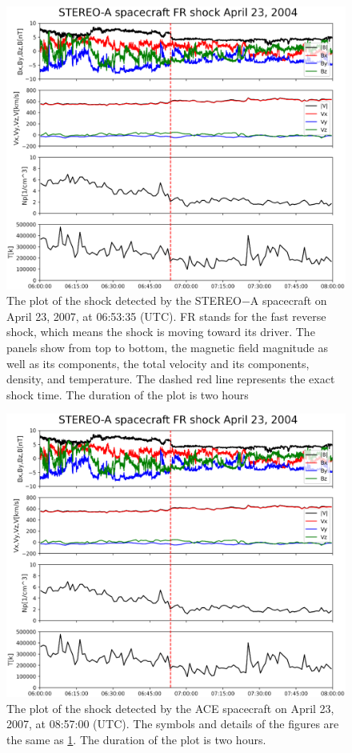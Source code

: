 \documentclass[draft]{agujournal2019}
\begin{document}
 \begin{figure}[!t]
\centering
\includegraphics[width=1.0\textwidth]{jgr-2023-ipshocks-f18.eps}
\caption{The plot of the shock detected by the STEREO$-$A spacecraft on April 23, 2007, at 06:53:35 (UTC). FR stands for the fast reverse shock, which means the shock is moving toward its driver. The panels show from top to bottom, the magnetic field magnitude as well as its components, the total velocity and its components, density, and temperature. The dashed red line represents the exact shock time. The duration of the plot is two hours}
\label{fig:staIP0423}
\end{figure}

\pagebreak

\begin{figure}[!t]
\centering
\includegraphics[width=1.\textwidth]{jgr-2023-ipshocks-f19.eps}
\caption{The plot of the shock detected by the ACE spacecraft on April 23, 2007, at 08:57:00 (UTC). The symbols and details of the figures are the same as \ref{fig:staIP0423}. The duration of the plot is two hours.}
\label{fig:aceIP0423}
\end{figure}
\end{document}
